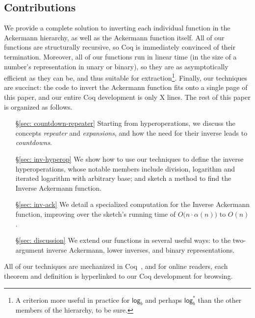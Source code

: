 \subsection{Contributions}
We provide a complete solution to inverting each individual function in the Ackermann hierarchy,
as well as the Ackermann function itself.  All of our functions are structurally recursive, so
Coq is immediately convinced of their termination.  Moreover, all of our functions run in linear
time (in the size of a number's representation in unary or binary), so they are as asymptotically efficient as they can be, and thus suitable for extraction\footnote{A criterion more useful in practice for $\mathsf{log}_b$ and perhaps $\mathsf{log}^*_b$ than the other members of the hierarchy, to be sure.}.  Finally, our techniques are succinct: the code to invert the Ackermann function fits onto a single page of this paper, and our entire Coq development is only {\color{red} X} lines. The rest of this paper is organized as follows.
\begin{itemize}
	\item[\S\ref{sec: countdown-repeater}] Starting from hyperoperations, we discuss the concepts \emph{repeater} and \emph{expansions}, and how the need for their inverse leads to \emph{countdowns}.
	\item[\S\ref{sec: inv-hyperop}] We show how to use our techniques to define the inverse hyperoperations, whose notable members include division, logarithm and iterated logarithm with arbitrary base; and sketch a method to find the Inverse Ackermann function.
	\item[\S\ref{sec: inv-ack}] We detail a specialized computation for the Inverse Ackermann function, improving over the sketch's running time of $O\big(n \cdot \alpha(n)\big)$ to $O(n)$.
	\item[\S\ref{sec: discussion}] We extend our functions in several useful ways: to the two-argument inverse Ackermann, lower inverses, and binary representations.
\end{itemize}
All of our techniques are mechanized in Coq~\cite{blah}, and for online readers, 
each theorem and definition is hyperlinked to our Coq development for browsing.

